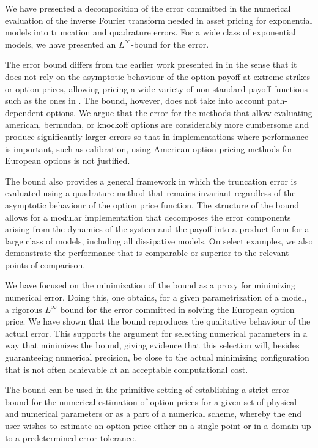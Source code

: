 \documentclass[11pt]{amsart}
\begin{document}
We have presented a decomposition of the error committed in
the numerical evaluation of the inverse Fourier transform needed
in asset pricing for exponential \levy models into truncation and
quadrature errors. For a wide class of exponential \levy models, we
have presented an $L^\infty$-bound for the error.

The error bound differs from the earlier work presented in \cite{lee2004option}
in the sense that it does not rely on the asymptotic behaviour of the option
payoff at extreme strikes or option prices, allowing pricing a wide variety
of non-standard payoff functions such as the ones in \cite{suh2008class}.
The bound, however, does not take into account path-dependent options. We
argue that the error for the methods that allow evaluating american, bermudan,
or knockoff options are considerably more cumbersome and produce significantly
larger errors so that in implementations where performance is important, such as
calibration, using American option pricing methods for European options is not justified.

The bound also provides a general framework in which
the truncation error is evaluated using a quadrature method that remains invariant
regardless of the asymptotic behaviour of the option price function.
The structure of the bound allows for
a modular implementation that decomposes the error components arising from
the dynamics of the system and the payoff into a product form for a large
class of models, including all dissipative models. On select examples, we
also demonstrate the performance that is comparable or superior to the
relevant points of comparison.

We have focused on the minimization of the bound as a proxy for minimizing numerical error.
Doing this, one obtains, for a given parametrization of a model, a rigorous $L^\infty$
bound for the error committed in solving the European option price. We have shown that the 
bound reproduces the qualitative behaviour of the actual error. This supports the argument for
selecting numerical parameters in a way that minimizes the bound, giving evidence that
this selection will, besides guaranteeing numerical precision, be close to the actual minimizing
configuration that is not often achievable at an acceptable computational cost.


The bound can be used in the primitive setting of establishing a strict error
bound for the numerical estimation of option prices for a given set of physical and
numerical parameters or as a part of a numerical
scheme, whereby the end user wishes to estimate an option price either on
a single point or in a domain up to a predetermined error tolerance.
\end{document}
